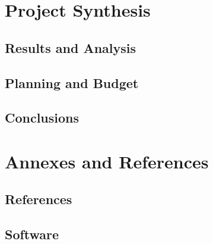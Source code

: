\documentclass{legrand}
\begin{document}
\part{Project Synthesis}

\chapter{Results and Analysis}
\label{chapter:results}


\chapter{Planning and Budget}
\label{chapter:planning}


\chapter{Conclusions}
\label{chapter:conclusions}


\part{Annexes and References}

\chapter{References} %
\printbibliography[heading=bibempty]


\appendix
\chapter{Software}


\printnoidxglossaries
\end{document}
